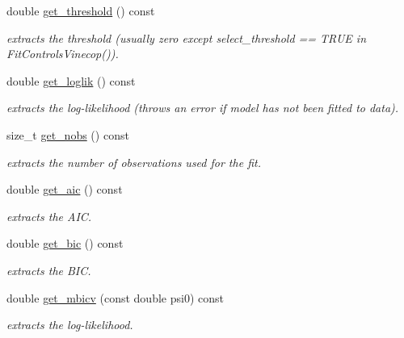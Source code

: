 \begin{DoxyCompactItemize}
\mbox{\label{classvinecopulib_1_1_vinecop_a1b8f3b15053e1d84b13b262e9833552d}} 
double \hyperlink{classvinecopulib_1_1_vinecop_a1b8f3b15053e1d84b13b262e9833552d}{get\+\_\+threshold} () const
\begin{DoxyCompactList}\small\item\em extracts the threshold (usually zero except {\ttfamily select\+\_\+threshold == T\+R\+UE} in {\ttfamily Fit\+Controls\+Vinecop()}). \end{DoxyCompactList}\item 
\mbox{\label{classvinecopulib_1_1_vinecop_a1525e0fbb288182518230ede06db1801}} 
double \hyperlink{classvinecopulib_1_1_vinecop_a1525e0fbb288182518230ede06db1801}{get\+\_\+loglik} () const
\begin{DoxyCompactList}\small\item\em extracts the log-\/likelihood (throws an error if model has not been fitted to data). \end{DoxyCompactList}\item 
size\+\_\+t \hyperlink{classvinecopulib_1_1_vinecop_a2260191b027249666f637dae58795a47}{get\+\_\+nobs} () const
\begin{DoxyCompactList}\small\item\em extracts the number of observations used for the fit. \end{DoxyCompactList}\item 
double \hyperlink{classvinecopulib_1_1_vinecop_a08fcd0fce480d68c47932fd4d68e5478}{get\+\_\+aic} () const
\begin{DoxyCompactList}\small\item\em extracts the A\+IC. \end{DoxyCompactList}\item 
double \hyperlink{classvinecopulib_1_1_vinecop_a29d0beb8d6c20c246c7b86f38d90e48d}{get\+\_\+bic} () const
\begin{DoxyCompactList}\small\item\em extracts the B\+IC. \end{DoxyCompactList}\item 
double \hyperlink{classvinecopulib_1_1_vinecop_ad694a38fd514fe339e00a00093b5aa33}{get\+\_\+mbicv} (const double psi0) const
\begin{DoxyCompactList}\small\item\em extracts the log-\/likelihood. \end{DoxyCompactList}\end{DoxyCompactItemize}


